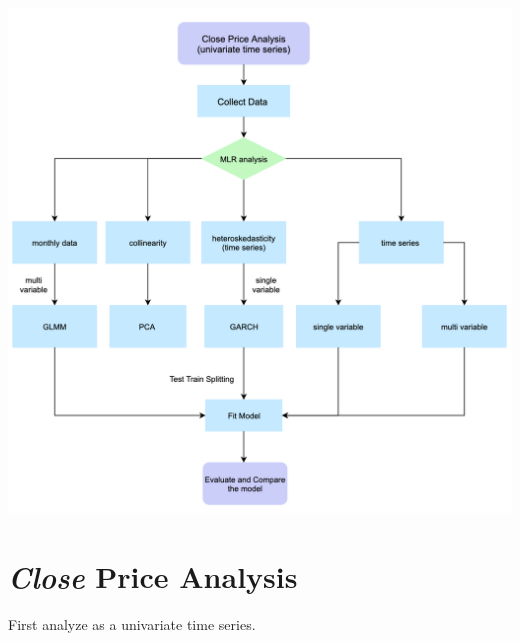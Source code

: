 \documentclass[a0,portrait]{a0poster}
\begin{document}
\begin{multicols}{3}
\begin{center}\vspace{1cm}
\includegraphics[width=22cm]{proce.png}
\label{flow}
\end{center}

\color{Black} %

\section*{\textit{Close} Price Analysis}
First analyze as a univariate time series.


\end{multicols}
\end{document}
